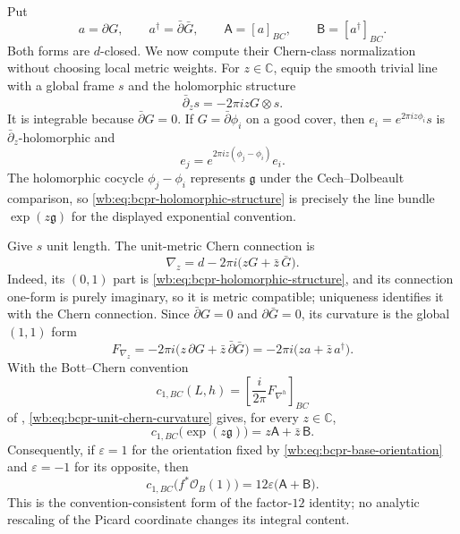 Put
\begin{equation}
 a=\partial G,
 \qquad a^\dagger=\bar\partial\bar G,
 \qquad
 \mathsf A=[a]_{BC},
 \qquad \mathsf B=[a^\dagger]_{BC}.
\label{wb:eq:bcpr-a-b-definitions}
\end{equation}
Both forms are $d$-closed.  We now compute their Chern-class normalization
without choosing local metric weights.  For $z\in\mathbb C$, equip the
smooth trivial line with a global frame $s$ and the holomorphic structure
\begin{equation}
 \bar\partial_zs=-2\pi i zG\otimes s.
\label{wb:eq:bcpr-holomorphic-structure}
\end{equation}
It is integrable because $\bar\partial G=0$.  If
$G=\bar\partial\phi_i$ on a good cover, then
$e_i=e^{2\pi iz\phi_i}s$ is $\bar\partial_z$-holomorphic and
\[
 e_j=e^{2\pi iz(\phi_j-\phi_i)}e_i.
\]
The holomorphic cocycle $\phi_j-\phi_i$ represents $\mathfrak g$ under
the Cech--Dolbeault comparison, so
\cref{wb:eq:bcpr-holomorphic-structure} is precisely the line bundle
$\exp(z\mathfrak g)$ for the displayed exponential convention.

Give $s$ unit length.  The unit-metric Chern connection is
\begin{equation}
 \nabla_z=d-2\pi i\bigl(zG+\bar z\,\bar G\bigr).
\label{wb:eq:bcpr-unit-chern-connection}
\end{equation}
Indeed, its $(0,1)$ part is
\cref{wb:eq:bcpr-holomorphic-structure}, and its connection one-form is
purely imaginary, so it is metric compatible; uniqueness identifies it
with the Chern connection.  Since $\bar\partial G=0$ and
$\partial\bar G=0$, its curvature is the global $(1,1)$ form
\begin{equation}
 F_{\nabla_z}
 =-2\pi i\bigl(z\,\partial G+
                 \bar z\,\bar\partial\bar G\bigr)
 =-2\pi i\bigl(za+\bar z\,a^\dagger\bigr).
\label{wb:eq:bcpr-unit-chern-curvature}
\end{equation}
With the Bott--Chern convention
\begin{equation}
 c_{1,BC}(L,h)=
 \left[\frac{i}{2\pi}F_{\nabla^h}\right]_{BC}
\label{wb:eq:bcpr-chern-convention}
\end{equation}
of \cite[\S8.a]{Schweitzer2007},
\cref{wb:eq:bcpr-unit-chern-curvature} gives, for every $z\in\mathbb C$,
\begin{equation}
 c_{1,BC}\bigl(\exp(z\mathfrak g)\bigr)
 =z\mathsf A+\bar z\,\mathsf B.
\label{wb:eq:bcpr-chern-exp-identity}
\end{equation}
Consequently, if $\varepsilon=1$ for the orientation fixed by
\cref{wb:eq:bcpr-base-orientation} and $\varepsilon=-1$ for its opposite,
then
\begin{equation}
 c_{1,BC}\bigl(f^*\mathcal O_B(1)\bigr)
 =12\varepsilon\bigl(\mathsf A+\mathsf B\bigr).
\label{wb:eq:bcpr-c1-pullback}
\end{equation}
This is the convention-consistent form of the factor-$12$ identity; no
analytic rescaling of the Picard coordinate changes its integral content.


